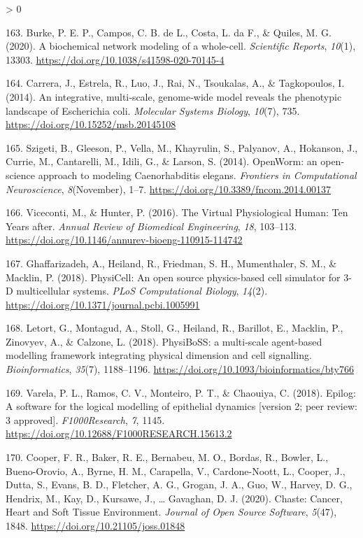 \documentclass[
  12pt,
]{book}
\newlength{\cslhangindent}
\newenvironment{CSLReferences}[2] %
 {%
  \setlength{\parindent}{0pt}
  \ifodd #1 \everypar{\setlength{\hangindent}{\cslhangindent}}\ignorespaces\fi
  \ifnum #2 > 0
  \setlength{\parskip}{#2\baselineskip}
  \fi
 }%
 {}
\begin{document}
\begin{CSLReferences}{1}{0}
\leavevmode\hypertarget{ref-Burke2020}{}%
163. Burke, P. E. P., Campos, C. B. de L., Costa, L. da F., \& Quiles, M. G. (2020). {A biochemical network modeling of a whole-cell}. \emph{Scientific Reports}, \emph{10}(1), 13303. \url{https://doi.org/10.1038/s41598-020-70145-4}

\leavevmode\hypertarget{ref-Carrera2014}{}%
164. Carrera, J., Estrela, R., Luo, J., Rai, N., Tsoukalas, A., \& Tagkopoulos, I. (2014). {An integrative, multi‐scale, genome‐wide model reveals the phenotypic landscape of Escherichia coli}. \emph{Molecular Systems Biology}, \emph{10}(7), 735. \url{https://doi.org/10.15252/msb.20145108}

\leavevmode\hypertarget{ref-Szigeti2014}{}%
165. Szigeti, B., Gleeson, P., Vella, M., Khayrulin, S., Palyanov, A., Hokanson, J., Currie, M., Cantarelli, M., Idili, G., \& Larson, S. (2014). {OpenWorm: an open-science approach to modeling Caenorhabditis elegans}. \emph{Frontiers in Computational Neuroscience}, \emph{8}(November), 1--7. \url{https://doi.org/10.3389/fncom.2014.00137}

\leavevmode\hypertarget{ref-Viceconti2016}{}%
166. Viceconti, M., \& Hunter, P. (2016). {The Virtual Physiological Human: Ten Years after}. \emph{Annual Review of Biomedical Engineering}, \emph{18}, 103--113. \url{https://doi.org/10.1146/annurev-bioeng-110915-114742}

\leavevmode\hypertarget{ref-Ghaffarizadeh2018}{}%
167. Ghaffarizadeh, A., Heiland, R., Friedman, S. H., Mumenthaler, S. M., \& Macklin, P. (2018). {PhysiCell: An open source physics-based cell simulator for 3-D multicellular systems}. \emph{PLoS Computational Biology}, \emph{14}(2). \url{https://doi.org/10.1371/journal.pcbi.1005991}

\leavevmode\hypertarget{ref-Letort2018}{}%
168. Letort, G., Montagud, A., Stoll, G., Heiland, R., Barillot, E., Macklin, P., Zinovyev, A., \& Calzone, L. (2018). {PhysiBoSS: a multi-scale agent-based modelling framework integrating physical dimension and cell signalling}. \emph{Bioinformatics}, \emph{35}(7), 1188--1196. \url{https://doi.org/10.1093/bioinformatics/bty766}

\leavevmode\hypertarget{ref-Varela2018}{}%
169. Varela, P. L., Ramos, C. V., Monteiro, P. T., \& Chaouiya, C. (2018). {Epilog: A software for the logical modelling of epithelial dynamics {[}version 2; peer review: 3 approved{]}}. \emph{F1000Research}, \emph{7}, 1145. \url{https://doi.org/10.12688/F1000RESEARCH.15613.2}

\leavevmode\hypertarget{ref-Cooper2020}{}%
170. Cooper, F. R., Baker, R. E., Bernabeu, M. O., Bordas, R., Bowler, L., Bueno-Orovio, A., Byrne, H. M., Carapella, V., Cardone-Noott, L., Cooper, J., Dutta, S., Evans, B. D., Fletcher, A. G., Grogan, J. A., Guo, W., Harvey, D. G., Hendrix, M., Kay, D., Kursawe, J., \ldots{} Gavaghan, D. J. (2020). {Chaste: Cancer, Heart and Soft Tissue Environment}. \emph{Journal of Open Source Software}, \emph{5}(47), 1848. \url{https://doi.org/10.21105/joss.01848}


\end{CSLReferences}
\end{document}
